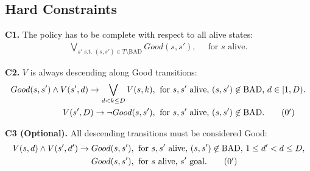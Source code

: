\documentclass[a4paper]{article}
\newcommand{\smallpar}[1]{{\vspace{10pt}\noindent \bf #1.}}
\newcommand{\badtx}{\ensuremath{\mathrm{BAD}}}
\begin{document}


\subsection{Hard Constraints}

\smallpar{C1}
The policy has to be complete with respect to all alive states:
\begin{align}
\bigvee_{s' \text{ s.t. } (s, s') \in T \setminus \badtx} Good(s, s'),&\;\; \text{for $s$ alive.}
\end{align}


\smallpar{C2} $V$ is always descending along Good transitions:
\begin{align}
 Good(s, s') \land V(s', d) \rightarrow \bigvee_{d < k \leq D} V(s, k),&\;\; \text{for $s, s'$ alive, $(s, s') \not\in \badtx$, $d \in [1, D)$.} \\
 V(s', D) \rightarrow \neg Good(s, s'),&\;\; \text{for $s, s'$ alive, $(s, s') \not\in \badtx$.} \tag{\theequation${}^\prime$}
\end{align}


\smallpar{C3 (Optional)} All descending transitions must be considered Good:
\begin{align}
 V(s, d) \land V(s', d') \rightarrow Good(s, s'),&\;\; \text{for $s, s'$ alive, $(s, s') \not\in \badtx$, $1 \leq d' < d \leq D$,} \\
 Good(s, s'),&\;\; \text{for $s$ alive, $s'$ goal.} \tag{\theequation${}^\prime$}
\end{align}

\end{document}
